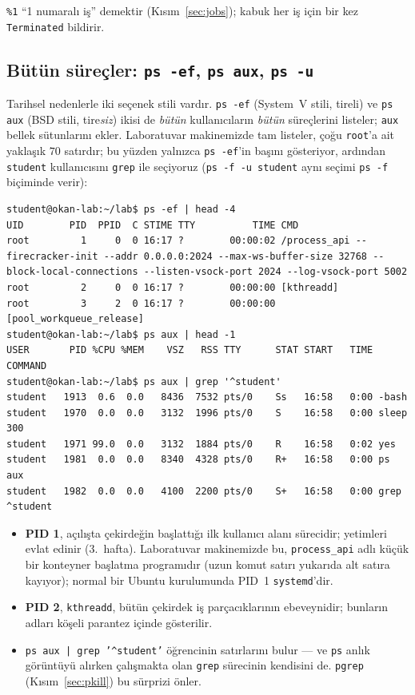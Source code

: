 \documentclass[11pt,a4paper]{article}
\newcommand{\cmd}[1]{\texttt{#1}}
\begin{document}
\texttt{\%1} ``1 numaralı iş'' demektir (Kısım~\ref{sec:jobs}); kabuk her iş için bir kez \texttt{Terminated} bildirir.

\subsection{Bütün süreçler: \texttt{ps -ef}, \texttt{ps aux}, \texttt{ps -u}}

Tarihsel nedenlerle iki seçenek stili vardır. \cmd{ps -ef} (System~V stili, tireli) ve \cmd{ps aux} (BSD stili, tire\emph{siz}) ikisi de \emph{bütün} kullanıcıların \emph{bütün} süreçlerini listeler; \cmd{aux} bellek sütunlarını ekler. Laboratuvar makinemizde tam listeler, çoğu \texttt{root}'a ait yaklaşık $70$ satırdır; bu yüzden yalnızca \cmd{ps -ef}'in başını gösteriyor, ardından \texttt{student} kullanıcısını \cmd{grep} ile seçiyoruz (\cmd{ps -f -u student} aynı seçimi \cmd{ps -f} biçiminde verir):

\begin{lstlisting}[style=wterm]
student@okan-lab:~/lab$ ps -ef | head -4
UID        PID  PPID  C STIME TTY          TIME CMD
root         1     0  0 16:17 ?        00:00:02 /process_api --firecracker-init --addr 0.0.0.0:2024 --max-ws-buffer-size 32768 --block-local-connections --listen-vsock-port 2024 --log-vsock-port 5002
root         2     0  0 16:17 ?        00:00:00 [kthreadd]
root         3     2  0 16:17 ?        00:00:00 [pool_workqueue_release]
student@okan-lab:~/lab$ ps aux | head -1
USER       PID %CPU %MEM    VSZ   RSS TTY      STAT START   TIME COMMAND
student@okan-lab:~/lab$ ps aux | grep '^student'
student   1913  0.6  0.0   8436  7532 pts/0    Ss   16:58   0:00 -bash
student   1970  0.0  0.0   3132  1996 pts/0    S    16:58   0:00 sleep 300
student   1971 99.0  0.0   3132  1884 pts/0    R    16:58   0:02 yes
student   1981  0.0  0.0   8340  4328 pts/0    R+   16:58   0:00 ps aux
student   1982  0.0  0.0   4100  2200 pts/0    S+   16:58   0:00 grep ^student
\end{lstlisting}

\begin{itemize}
  \item \textbf{PID 1}, açılışta çekirdeğin başlattığı ilk kullanıcı alanı sürecidir; yetimleri evlat edinir (3.~hafta). Laboratuvar makinemizde bu, \texttt{process\_api} adlı küçük bir konteyner başlatma programıdır (uzun komut satırı yukarıda alt satıra kayıyor); normal bir Ubuntu kurulumunda PID~1 \cmd{systemd}'dir.
  \item \textbf{PID 2}, \texttt{kthreadd}, bütün çekirdek iş parçacıklarının ebeveynidir; bunların adları köşeli parantez içinde gösterilir.
  \item \cmd{ps aux | grep '\textasciicircum student'} öğrencinin satırlarını bulur --- ve \cmd{ps} anlık görüntüyü alırken çalışmakta olan \cmd{grep} sürecinin kendisini de. \cmd{pgrep} (Kısım~\ref{sec:pkill}) bu sürprizi önler.
\end{itemize}
\end{document}
